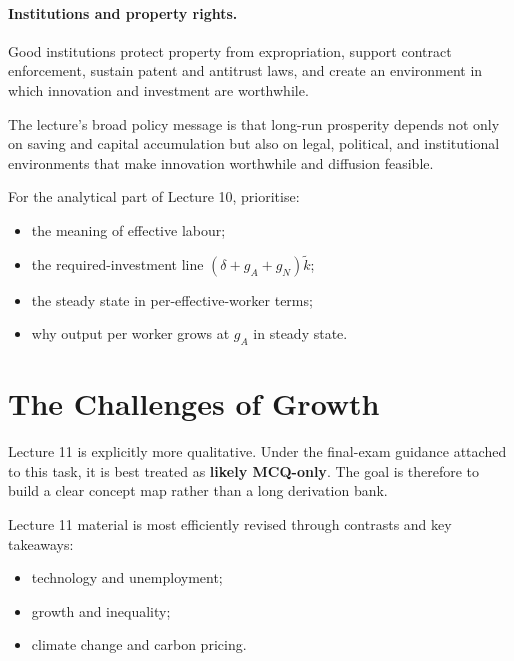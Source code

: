 \documentclass[12pt]{article}
\begin{document}
\paragraph{Institutions and property rights.}
Good institutions protect property from expropriation, support contract enforcement, sustain patent and antitrust laws, and create an environment in which innovation and investment are worthwhile.

\begin{policynote}
The lecture's broad policy message is that long-run prosperity depends not only on saving and capital accumulation but also on legal, political, and institutional environments that make innovation worthwhile and diffusion feasible.
\end{policynote}

\begin{examtip}[title={Exam Focus: High priority for short-answer}]
For the analytical part of Lecture 10, prioritise:
\begin{itemize}[leftmargin=1.5em]
\item the meaning of effective labour;
\item the required-investment line $(\delta+g_A+g_N)\tilde{k}$;
\item the steady state in per-effective-worker terms;
\item why output per worker grows at $g_A$ in steady state.
\end{itemize}
\end{examtip}

\newpage


\section{The Challenges of Growth}

Lecture 11 is explicitly more qualitative. Under the final-exam guidance attached to this task, it is best treated as \textbf{likely MCQ-only}. The goal is therefore to build a clear concept map rather than a long derivation bank.

\begin{examtip}[title={Exam Focus: Likely MCQ-only}]
Lecture 11 material is most efficiently revised through contrasts and key takeaways:
\begin{itemize}[leftmargin=1.5em]
\item technology and unemployment;
\item growth and inequality;
\item climate change and carbon pricing.
\end{itemize}
\end{examtip}
\end{document}
